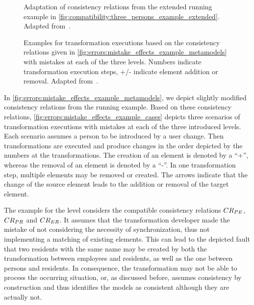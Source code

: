 \begin{figure}
    \centering
    
    \caption[Adaptation of consistency relations from running example]{Adaptation of consistency relations from the extended running example in \autoref{fig:compatibility:three_persons_example_extended}. Adapted from~.}
    \label{fig:errors:mistake_effects_example_metamodels}
\end{figure}

\begin{figure}
    \centering
    
    \caption[Examples for mistakes at each level]{Examples for transformation executions based on the consistency relations given in \autoref{fig:errors:mistake_effects_example_metamodels} with mistakes at each of the three levels. Numbers indicate transformation execution steps, +/- indicate element addition or removal. Adapted from~.}
    \label{fig:errors:mistake_effects_example_cases}
\end{figure}

In \autoref{fig:errors:mistake_effects_example_metamodels}, we depict slightly modified consistency relations from the running example.
Based on these consistency relations, \autoref{fig:errors:mistake_effects_example_cases} depicts three scenarios of transformation executions with mistakes at each of the three introduced levels.
Each scenario assumes a person to be introduced by a user change.
Then transformations are executed and produce changes in the order depicted by the numbers at the transformations.
The creation of an element is denoted by a \enquote{+}, whereas the removal of an element is denoted by a \enquote{-}.
In one transformation step, multiple elements may be removed or created.
The arrows indicate that the change of the source element leads to the addition or removal of the target element.

The example for the \leveltransformation level considers the compatible consistency relations $CR_{PE}$, $CR_{PR}$ and $CR_{ER}$. It assumes that the transformation developer made the mistake of not considering the necessity of synchronization, thus not implementing a matching of existing elements.
This can lead to the depicted fault that two residents with the same name may be created by both the transformation between employees and residents, as well as the one between persons and residents.
In consequence, the transformation may not be able to process the occurring situation, or, as discussed before,  assumes consistency by construction and thus identifies the models as consistent although they are actually not.

